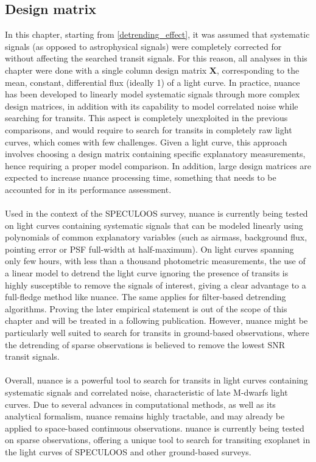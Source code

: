 \documentclass{aastex631}
\begin{document}
\subsection*{Design matrix}

In this chapter, starting from \autoref{detrending_effect}, it was assumed that systematic signals (as opposed to astrophysical signals) were completely corrected for without affecting the searched transit signals. For this reason, all analyses in this chapter were done with a single column design matrix $\bm{X}$, corresponding to the mean, constant, differential flux (ideally 1) of a light curve. In practice, \textsf{nuance} has been developed to linearly model systematic signals through more complex design matrices, in addition with its capability to model correlated noise while searching for transits. This aspect is completely unexploited in the previous comparisons, and would require to search for transits in completely raw light curves, which comes with few challenges. Given a light curve, this approach involves choosing a design matrix containing specific explanatory measurements, hence requiring a proper model comparison. In addition, large design matrices are expected to increase \textsf{nuance} processing time, something that needs to be accounted for in its performance assessment.\\\\
Used in the context of the SPECULOOS survey, \textsf{nuance} is currently being tested on light curves containing systematic signals that can be modeled linearly using polynomials of common explanatory variables (such as airmass, background flux, pointing error or PSF full-width at half-maximum). On light curves spanning only few hours, with less than a thousand photometric measurements, the use of a linear model to detrend the light curve ignoring the presence of transits is highly susceptible to remove the signals of interest, giving a clear advantage to a full-fledge method like \textsf{nuance}. The same applies for filter-based detrending algorithms. Proving the later empirical statement is out of the scope of this chapter and will be treated in a following publication. However, \textsf{nuance} might be particularly well suited to search for transits in ground-based observations, where the detrending of sparse observations is believed to remove the lowest SNR transit signals.\\\\
Overall, \textsf{nuance} is a powerful tool to search for transits in light curves containing systematic signals and correlated noise, characteristic of late M-dwarfs light curves. Due to several advances in computational methods, as well as its analytical formalism, \textsf{nuance}  remains highly tractable, and may already be applied to space-based continuous observations. \textsf{nuance} is currently being tested on sparse observations, offering a unique tool to search for transiting exoplanet in the light curves of SPECULOOS and other ground-based surveys. 
\end{document}

